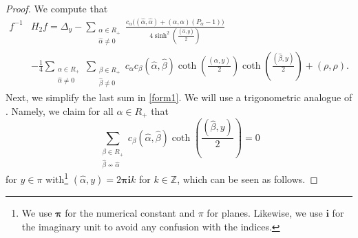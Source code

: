 \documentclass[12pt]{amsart}
\numberwithin{equation}{section}
\theoremstyle{definition}
\begin{document}
\begin{proof}
We compute that
\begin{align}
    f^{-1} &H_2 f = \Delta_y - \sum\limits_{\substack{\alpha \in R_+ \\ \widehat{\alpha} \neq 0}}\frac{c_{\alpha}\big((\widehat{\alpha}, \widehat{\alpha}) + (\alpha, \alpha) (P_{\alpha}-1)\big)}{4 \sinh^2 \left(\frac{(\widehat{\alpha}, y)}{2}\right)} \label{form1}
    \\
     & - \frac{1}{4} \sum\limits_{\substack{\alpha \in R_+ \\ \widehat{\alpha} \neq 0}} \sum\limits_{\substack{ \beta \in R_+ \\ \widehat{\beta} \neq 0 }} c_{\alpha} c_{\beta} (\widehat{\alpha}, \widehat{\beta}) \coth\left(\frac{(\widehat{\alpha}, y)}{2}\right) \coth\left(\frac{(\widehat{\beta}, y)}{2}\right) + (\rho, \rho). \nonumber
\end{align}
Next, we simplify the last sum in \eqref{form1}. We will use a trigonometric analogue of \cite[Equality (10)]{Feigin}.
Namely, we claim for all $\alpha \in R_+$ that
\begin{equation}
\label{trigeq}
    \sum\limits_{\substack{\beta \in R_+ \\ \widehat{\beta} \nsim \widehat{\alpha}}} 
    c_{\beta} (\widehat{\alpha},\widehat{\beta}) \coth\left(\frac{(\widehat{\beta}, y)}{2}\right) = 0
\end{equation}
for $y \in \pi$ with\footnote{We use $\boldsymbol{\pi}$ for the numerical constant and $\pi$ for planes. Likewise, we use $\boldsymbol{i}$ for the imaginary unit to avoid any confusion with the indices.} $(\widehat{\alpha}, y) = 2  \boldsymbol{\pi} \boldsymbol{i}k$ for $k \in \mathbb{Z}$, which can be seen as follows. 


\end{proof}
\end{document}
